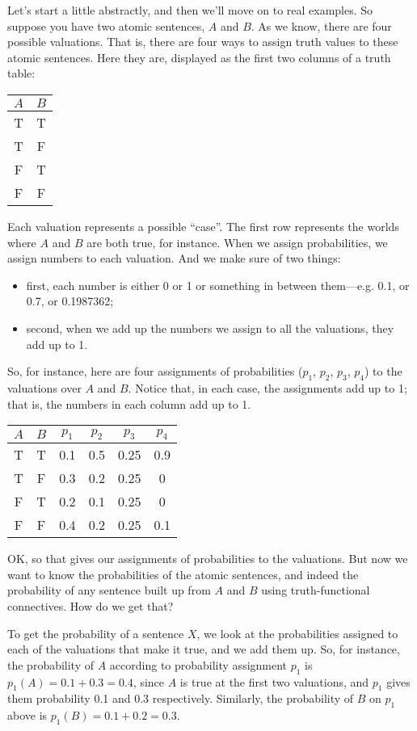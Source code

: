 Let's start a little abstractly, and then we'll move on to real examples. So suppose you have two atomic sentences, $A$ and $B$. As we know, there are four possible valuations. That is, there are four ways to assign truth values to these atomic sentences. Here they are, displayed as the first two columns of a truth table:
\begin{center}
\begin{tabular}{cc}
$A$ & $B$ \\
\hline
T & T \\
T & F \\
F & T \\
F & F
\end{tabular}
\end{center}
Each valuation represents a possible ``case''. The first row represents the worlds where $A$ and $B$ are both true, for instance. When we assign probabilities, we assign numbers to each valuation. And we make sure of two things:
\begin{itemize}
\item first, each number is either 0 or 1 or something in between them---e.g. 0.1, or 0.7, or 0.1987362;
\item second, when we add up the numbers we assign to all the valuations, they add up to 1.
\end{itemize}
So, for instance, here are four assignments of probabilities ($p_1$, $p_2$, $p_3$, $p_4$) to the valuations over $A$ and $B$. Notice that, in each case, the assignments  add up to 1; that is, the numbers in each column add up to 1.
\begin{center}
\begin{tabular}{cc|c|c|c|c}
$A$ & $B$ & $p_1$ & $p_2$ & $p_3$ & $p_4$\\
\hline
T & T & 0.1 & 0.5 & 0.25 & 0.9\\
T & F & 0.3 & 0.2 & 0.25 & 0 \\
F & T & 0.2 & 0.1 & 0.25 & 0 \\
F & F & 0.4 & 0.2 & 0.25 & 0.1 
\end{tabular}
\end{center}
OK, so that gives our assignments of probabilities to the valuations. But now we want to know the probabilities of the atomic sentences, and indeed the probability of any sentence built up from $A$ and $B$ using truth-functional connectives. How do we get that?

To get the probability of a sentence $X$, we look at the probabilities assigned to each of the valuations that make it true, and we add them up. So, for instance, the probability of $A$ according to probability assignment $p_1$ is $p_1(A) = 0.1 + 0.3 = 0.4$, since $A$ is true at the first two valuations, and $p_1$ gives them probability 0.1 and 0.3 respectively. Similarly, the probability of $B$ on $p_1$ above is $p_1(B) = 0.1 + 0.2 = 0.3$.

